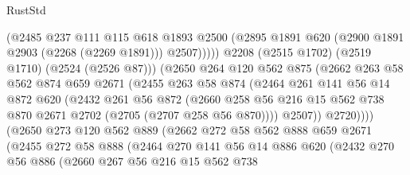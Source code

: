 \begin{lexlean}{RustStd}
\begin{coremodule}
                          (@2485
                            @237
                            @111
                            @115
                            @618
                            @1893
                            @2500
                            (@2895 @1891 @620 (@2900 @1891 @2903 (@2268 (@2269 @1891))) @2507)))))
                    @2208
                    (@2515 @1702)
                    (@2519 @1710)
                    (@2524 (@2526 @87)))
                  (@2650
                    @264
                    @120
                    @562
                    @875
                    (@2662
                      @263
                      @58
                      @562
                      @874
                      @659
                      @2671
                      (@2455
                        @263
                        @58
                        @874
                        (@2464
                          @261
                          @141
                          @56
                          @14
                          @872
                          @620
                          (@2432
                            @261
                            @56
                            @872
                            (@2660
                              @258
                              @56
                              @216
                              @15
                              @562
                              @738
                              @870
                              @2671
                              @2702
                              (@2705 (@2707 @258 @56 @870))))
                          @2507))
                      @2720))))
              (@2650
                @273
                @120
                @562
                @889
                (@2662
                  @272
                  @58
                  @562
                  @888
                  @659
                  @2671
                  (@2455
                    @272
                    @58
                    @888
                    (@2464
                      @270
                      @141
                      @56
                      @14
                      @886
                      @620
                      (@2432
                        @270
                        @56
                        @886
                        (@2660
                          @267
                          @56
                          @216
                          @15
                          @562
                          @738

\end{coremodule}
\end{lexlean}
